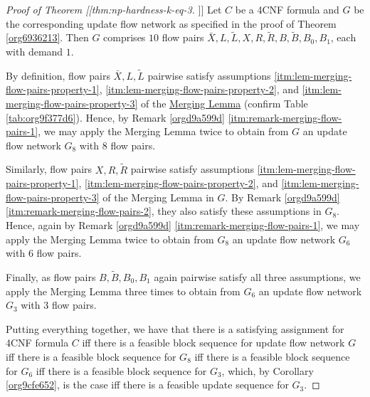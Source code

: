 \documentclass[fontsize=11pt,paper=a4]{book}
\begin{document}
\begin{proof}[Proof of Theorem [[thm:np-hardness-k-eq-3]]]
Let \(C\) be a 4CNF formula and \(G\) be the corresponding update flow network as specified in the proof of Theorem \ref{org6936213}.
Then \(G\) comprises \(10\) flow pairs \(\bar{X},L,\tilde{L},X,R,\tilde{R},B,\tilde{B},B_0,B_1\), each with demand \(1\).

By definition, flow pairs \(\bar{X},L,\tilde{L}\) pairwise satisfy assumptions \ref{itm:lem-merging-flow-pairs-property-1}, \ref{itm:lem-merging-flow-pairs-property-2}, and \ref{itm:lem-merging-flow-pairs-property-3} of the \hyperref[orgf9b0f0c]{Merging Lemma} (confirm Table \ref{tab:org9f377d6}).
Hence, by Remark \ref{orgd9a599d} \ref{itm:remark-merging-flow-pairs-1}, we may apply the Merging Lemma twice to obtain from \(G\) an update flow network \(G_8\) with \(8\) flow pairs.

Similarly, flow pairs \(X,R,\tilde{R}\) pairwise satisfy assumptions \ref{itm:lem-merging-flow-pairs-property-1}, \ref{itm:lem-merging-flow-pairs-property-2}, and \ref{itm:lem-merging-flow-pairs-property-3} of the Merging Lemma in \(G\).
By Remark \ref{orgd9a599d} \ref{itm:remark-merging-flow-pairs-2}, they also satisfy these assumptions in \(G_8\).
Hence, again by Remark \ref{orgd9a599d} \ref{itm:remark-merging-flow-pairs-1}, we may apply the Merging Lemma twice to obtain from \(G_8\) an update flow network \(G_6\) with \(6\) flow pairs.

Finally, as flow pairs \(B,\tilde{B},B_0,B_1\) again pairwise satisfy all three assumptions, we apply the Merging Lemma three times to obtain from \(G_6\) an update flow network \(G_3\) with \(3\) flow pairs.

Putting everything together, we have that there is a satisfying assignment for 4CNF formula \(C\) iff there is a feasible block sequence for update flow network \(G\) iff there is a feasible block sequence for \(G_8\) iff there is a feasible block sequence for \(G_6\) iff there is a feasible block sequence for \(G_3\), which, by Corollary \ref{org9cfe652}, is the case iff there is a feasible update sequence for \(G_3\).
\end{proof}
\end{document}
